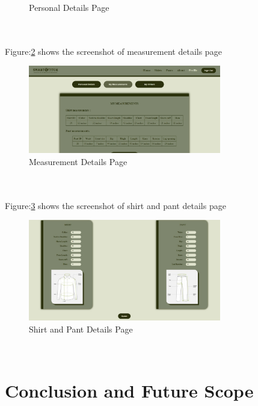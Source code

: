 \documentclass[12pt, letter paper]{report}
\begin{document}
{\begin{figure}[h]
 \caption{Personal Details Page}
 \label{fig:PersonalDetails.jpeg}
\end{figure}
\\
\\
Figure:\ref{fig:Measurements.jpeg} shows the screenshot of measurement details page
\begin{figure}[h]
 \centering
 \includegraphics[width=0.75\textwidth]{Measurements.jpeg}
 \caption{Measurement Details Page}
 \label{fig:Measurements.jpeg}
\end{figure}
\\
\\
Figure:\ref{fig:Shirt_and_Pant.jpeg} shows the screenshot of shirt and pant details page
\begin{figure}[h!]
 \centering
 \includegraphics[width=0.75\textwidth]{Shirt_and_Pant.jpeg}
 \caption{Shirt and Pant Details Page}
 \label{fig:Shirt_and_Pant.jpeg}
\end{figure}
\\
\chapter{Conclusion and Future Scope}

}
\end{document}
